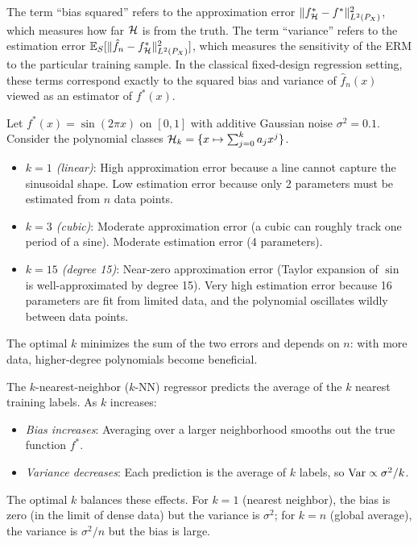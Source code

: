 \documentclass[11pt,a4paper]{article}
\begin{document}
\begin{remark}
\label{rem:bv_naming}
The term ``bias squared'' refers to the approximation error
$\|f_{\mathcal{H}}^* - f^*\|_{L^2(P_X)}^2$, which measures how far
$\mathcal{H}$ is from the truth.  The term ``variance'' refers to the
estimation error $\mathbb{E}_S[\|\hat{f}_n - f_{\mathcal{H}}^*\|_{L^2(P_X)}^2]$,
which measures the sensitivity of the ERM to the particular training
sample.  In the classical fixed-design regression setting, these
terms correspond exactly to the squared bias and variance of
$\hat{f}_n(x)$ viewed as an estimator of $f^*(x)$.
\end{remark}

\begin{example}
\label{ex:poly_bv}
Let $f^*(x) = \sin(2\pi x)$ on $[0, 1]$ with additive Gaussian
noise $\sigma^2 = 0.1$.  Consider the polynomial classes
$\mathcal{H}_k = \{x \mapsto \sum_{j=0}^k a_j x^j\}$.
\begin{itemize}[nosep]
    \item \emph{$k = 1$ (linear)}: High approximation error because
    a line cannot capture the sinusoidal shape.  Low estimation error
    because only 2 parameters must be estimated from $n$ data points.
    \item \emph{$k = 3$ (cubic)}: Moderate approximation error (a
    cubic can roughly track one period of a sine).  Moderate
    estimation error (4 parameters).
    \item \emph{$k = 15$ (degree 15)}: Near-zero approximation error
    (Taylor expansion of $\sin$ is well-approximated by degree 15).
    Very high estimation error because 16 parameters are fit from
    limited data, and the polynomial oscillates wildly between
    data points.
\end{itemize}
The optimal $k$ minimizes the sum of the two errors and depends on
$n$: with more data, higher-degree polynomials become beneficial.
\end{example}

\begin{example}
\label{ex:nn_bv}
The $k$-nearest-neighbor ($k$-NN) regressor predicts the average
of the $k$ nearest training labels.  As $k$ increases:
\begin{itemize}[nosep]
    \item \emph{Bias increases}: Averaging over a larger neighborhood
    smooths out the true function $f^*$.
    \item \emph{Variance decreases}: Each prediction is the average of
    $k$ labels, so $\operatorname{Var} \propto \sigma^2/k$.
\end{itemize}
The optimal $k$ balances these effects.  For $k = 1$ (nearest
neighbor), the bias is zero (in the limit of dense data) but the
variance is $\sigma^2$; for $k = n$ (global average), the variance
is $\sigma^2/n$ but the bias is large.
\end{example}
\end{document}
